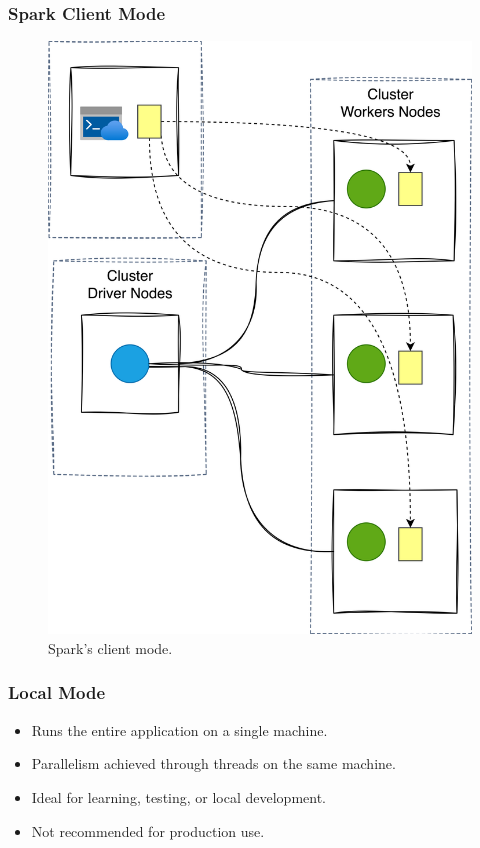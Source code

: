 \begin{frame}
    \frametitle{Spark Client Mode}
    \begin{figure}
        \includegraphics[width=\textwidth,height=.7\textheight,keepaspectratio]{./Figures/chapter-04/spark_client_mode}
        \caption{Spark’s client mode.}\label{fig:client_mode}
    \end{figure}
\end{frame}

\begin{frame}
    \frametitle{Local Mode}
    \begin{itemize}
        \item Runs the entire application on a single machine.
        \item Parallelism achieved through threads on the same machine.
        \item Ideal for learning, testing, or local development.
        \item Not recommended for production use.
    \end{itemize}
\end{frame}

